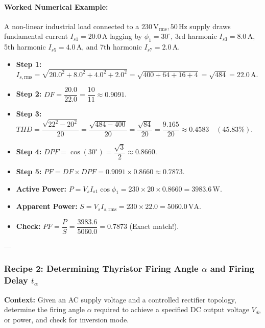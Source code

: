 \paragraph{Worked Numerical Example:}
A non-linear industrial load connected to a $230\,\si{\volt}_{\mathrm{rms}}, 50\,\si{\hertz}$ supply draws fundamental current $I_{s1} = 20.0\,\si{\ampere}$ lagging by $\phi_1 = 30^\circ$, 3rd harmonic $I_{s3} = 8.0\,\si{\ampere}$, 5th harmonic $I_{s5} = 4.0\,\si{\ampere}$, and 7th harmonic $I_{s7} = 2.0\,\si{\ampere}$.
\begin{itemize}
  \item \textbf{Step 1:} $I_{s,\mathrm{rms}} = \sqrt{20.0^2 + 8.0^2 + 4.0^2 + 2.0^2} = \sqrt{400 + 64 + 16 + 4} = \sqrt{484} = 22.0\,\si{\ampere}$.
  \item \textbf{Step 2:} $DF = \dfrac{20.0}{22.0} = \dfrac{10}{11} \approx 0.9091$.
  \item \textbf{Step 3:} $THD = \dfrac{\sqrt{22^2 - 20^2}}{20} = \dfrac{\sqrt{484 - 400}}{20} = \dfrac{\sqrt{84}}{20} = \dfrac{9.165}{20} \approx 0.4583 \quad (45.83\%)$.
  \item \textbf{Step 4:} $DPF = \cos(30^\circ) = \dfrac{\sqrt{3}}{2} \approx 0.8660$.
  \item \textbf{Step 5:} $PF = DF \times DPF = 0.9091 \times 0.8660 \approx 0.7873$.
  \item \textbf{Active Power:} $P = V_s I_{s1}\cos\phi_1 = 230 \times 20 \times 0.8660 = 3983.6\,\si{\watt}$.
  \item \textbf{Apparent Power:} $S = V_s I_{s,\mathrm{rms}} = 230 \times 22.0 = 5060.0\,\si{\volt\ampere}$.
  \item \textbf{Check:} $PF = \dfrac{P}{S} = \dfrac{3983.6}{5060.0} = 0.7873$ (Exact match!).
\end{itemize}

---

\subsubsection{Recipe 2: Determining Thyristor Firing Angle $\alpha$ and Firing Delay $t_\alpha$}
\noindent\textbf{Context:} Given an AC supply voltage and a controlled rectifier topology, determine the firing angle $\alpha$ required to achieve a specified DC output voltage $V_{dc}$ or power, and check for inversion mode.

